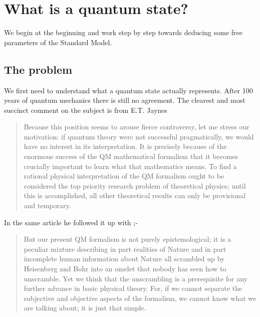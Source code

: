 \section{What is a quantum state?}
\label{sec:what_is_a_quantum_state}
We begin at the beginning and work step by step towards deducing some free parameters of the Standard Model.
\subsection{The problem}
  We first need to understand what a quantum state actually represents. After 100 years of quantum mechanics there is still no agreement. The clearest and most succinct comment on the subject is from E.T. Jaynes \autocite{Jaynes_89_a}
\begin{quotation}
  Because this position seems to arouse fierce controversy, let me stress our motivation: if quantum theory were not successful pragmatically, we would have no interest in its interpretation. It is precisely because of the enormous success of the QM mathematical formalism that it becomes crucially important to learn what that mathematics means. To find a rational physical interpretation of the QM formalism ought to be considered the top priority research problem of theoretical physics; until this is accomplished, all other theoretical results can only be provisional and temporary.
\end{quotation}
In the same article he followed it up with ;-
\begin{quotation}
  But our present QM formalism is not purely epistemological; it is a peculiar mixture describing in part realities of Nature and in part incomplete human information about Nature all scrambled up by Heisenberg and Bohr into an omelet that nobody has seen how to unscramble. Yet we think that the unscrambling is a prerequisite for any further advance in basic physical theory. For, if we cannot separate the subjective and objective aspects of the formalism, we cannot know what we are talking about; it is just that simple.
\end{quotation}

